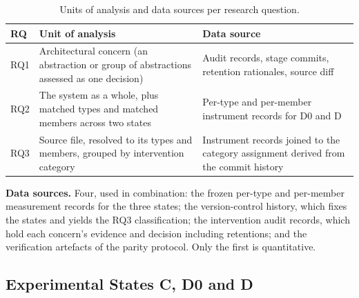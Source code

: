 \documentclass{sbc2019}%
\begin{document}
\begin{table}[!htbp]
\centering
\caption{Units of analysis and data sources per research question.}\label{tab:units}
\small
\begin{tabular}{p{}p{}p{}}
\toprule
\textbf{RQ} & \textbf{Unit of analysis} & \textbf{Data source} \\
\midrule
RQ1 & Architectural concern (an abstraction or group of abstractions assessed as
one decision) & Audit records, stage commits, retention rationales, source diff \\
\addlinespace
RQ2 & The system as a whole, plus matched types and matched members across two
states & Per-type and per-member instrument records for D0 and D \\
\addlinespace
RQ3 & Source file, resolved to its types and members, grouped by intervention
category & Instrument records joined to the category assignment derived from the
commit history \\
\bottomrule
\end{tabular}
\end{table}

\textbf{Data sources.} Four, used in combination: the frozen per-type and
per-member measurement records for the three states; the version-control history,
which fixes the states and yields the RQ3 classification; the intervention audit
records, which hold each concern's evidence and decision including retentions; and
the verification artefacts of the parity protocol. Only the first is quantitative.

\subsection{Experimental States C, D0 and D}
\end{document}
